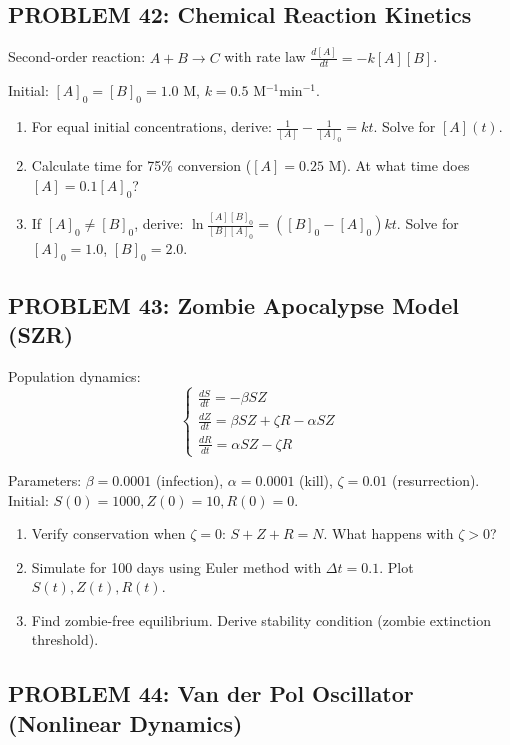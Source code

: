 \documentclass[12pt]{article}
\begin{document}
\subsection*{PROBLEM 42: Chemical Reaction Kinetics}

Second-order reaction: \(A + B \to C\) with rate law \(\frac{d[A]}{dt} = -k[A][B]\).

Initial: \([A]_0 = [B]_0 = 1.0\) M, \(k = 0.5\) M\(^{-1}\)min\(^{-1}\).

\begin{enumerate}
\item[(a)] For equal initial concentrations, derive: \(\frac{1}{[A]} - \frac{1}{[A]_0} = kt\). Solve for \([A](t)\).
\item[(b)] Calculate time for 75\% conversion (\([A] = 0.25\) M). At what time does \([A] = 0.1[A]_0\)?
\item[(c)] If \([A]_0 \neq [B]_0\), derive: \(\ln\frac{[A][B]_0}{[B][A]_0} = ([B]_0 - [A]_0)kt\). Solve for \([A]_0 = 1.0\), \([B]_0 = 2.0\).
\end{enumerate}

\subsection*{PROBLEM 43: Zombie Apocalypse Model (SZR)}

Population dynamics:
\[
\begin{cases}
\frac{dS}{dt} = -\beta SZ \\
\frac{dZ}{dt} = \beta SZ + \zeta R - \alpha SZ \\
\frac{dR}{dt} = \alpha SZ - \zeta R
\end{cases}
\]

Parameters: \(\beta = 0.0001\) (infection), \(\alpha = 0.0001\) (kill), \(\zeta = 0.01\) (resurrection).
Initial: \(S(0) = 1000, Z(0) = 10, R(0) = 0\).

\begin{enumerate}
\item[(a)] Verify conservation when \(\zeta = 0\): \(S + Z + R = N\). What happens with \(\zeta > 0\)?
\item[(b)] Simulate for 100 days using Euler method with \(\Delta t = 0.1\). Plot \(S(t), Z(t), R(t)\).
\item[(c)] Find zombie-free equilibrium. Derive stability condition (zombie extinction threshold).
\end{enumerate}

\subsection*{PROBLEM 44: Van der Pol Oscillator (Nonlinear Dynamics)}
\end{document}
